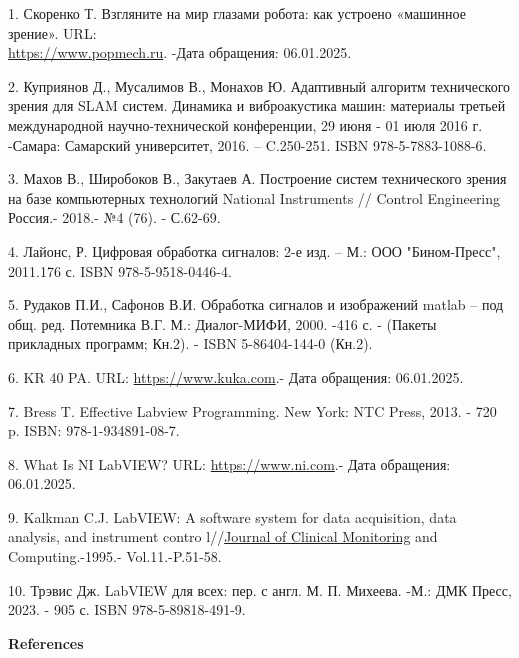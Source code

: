 \begin{references}
1. Скоренко Т. Взгляните на мир глазами робота: как устроено «машинное
зрение». URL:\\
\href{https://www.popmech.ru/technologies/238704-glazami-robota-chtotakoe-mashinnoe-zrenie/}{https://www.popmech.ru}. -Дата обращения: 06.01.2025.

2. Куприянов Д., Мусалимов В., Монахов Ю. Адаптивный алгоритм
технического зрения для SLAM систем. Динамика и виброакустика машин:
материалы третьей международной научно-технической конференции, 29 июня
- 01 июля 2016 г. -Самара: Самарский университет, 2016. -- C.250-251.
ISBN 978-5-7883-1088-6.

3. Махов В., Широбоков В., Закутаев А. Построение систем технического
зрения на базе компьютерных технологий National Instruments // Control
Engineering Россия.- 2018.- №4 (76). - С.62-69.

4. Лайонс, Р. Цифровая обработка сигналов: 2-е изд. -- М.: ООО
"Бином-Пресс", 2011.176 с. ISBN 978-5-9518-0446-4.

5. Рудаков П.И., Сафонов В.И. Обработка сигналов и изображений matlab --
под общ. ред. Потемника В.Г. М.: Диалог-МИФИ, 2000. -416 с. - (Пакеты
прикладных программ; Кн.2). - ISBN 5-86404-144-0 (Кн.2).

6. KR 40 PA.
URL: \href{https://www.kuka.com/en-de/products/robot-systems/industrial-robots/kr-40-pa.html}{https://www.kuka.com}.-
Дата обращения: 06.01.2025.

7. Bress T. Effective Labview Programming. New York: NTC Press, 2013. -
720 p. ISBN: 978-1-934891-08-7.

8. What Is NI LabVIEW? URL: \href{https://www.ni.com/ru-ru/shop/labview.html}{https://www.ni.com}.-
Дата обращения: 06.01.2025.

9. Kalkman C.J. LabVIEW: A software system for data acquisition, data
analysis, and instrument contro
l//\href{https://link.springer.com/journal/10877}{Journal of Clinical
Monitoring} and Computing.-1995.- Vol.11.-P.51-58.

10. Трэвис Дж. LabVIEW для всех: пер. с англ. М. П. Михеева. -М.: ДМК
Пресс, 2023. - 905 с. ISBN 978-5-89818-491-9.
\end{references}

\begin{center}
{\bfseries References}
\end{center}


